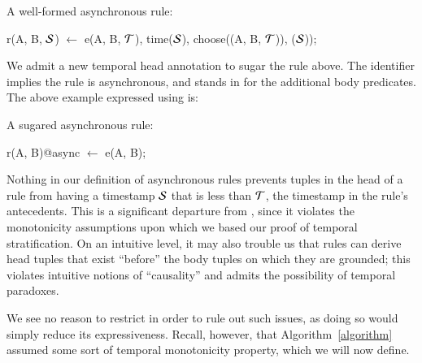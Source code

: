 \begin{example}
A well-formed asynchronous \lang rule:

\begin{Dedalus}
r(A, B, \(\SDedalus\)) \(\leftarrow\) 
  e(A, B, \(\Tau\)),
  time(\(\SDedalus\)), choose((A, B, \(\Tau\))), (\(\SDedalus\)));
\end{Dedalus}
\end{example}

We admit a new temporal head annotation to sugar the rule above.  The
identifier  implies the rule is asynchronous, and stands in for
the additional body predicates.
The above example expressed using  is:

\begin{example}
	A sugared asynchronous \lang rule:
	
\begin{Dedalus}
r(A, B)@async \(\leftarrow\) e(A, B);
\end{Dedalus}
\end{example}


Nothing in our definition of asynchronous rules prevents tuples in the
head of a rule from having a timestamp $\SDedalus$ that is less than
$\Tau$, the timestamp in the rule's antecedents. This is a significant
departure from \slang, since it violates the monotonicity assumptions
upon which we based our proof of temporal stratification.  On an
intuitive level, it may also trouble us that rules can derive head
tuples that exist ``before'' the body tuples on which they are
grounded; this violates intuitive notions of ``causality'' and admits
the possibility of temporal paradoxes.

We see no reason to restrict \lang in order to rule out such issues,
as doing so would simply reduce its expressiveness.  Recall, however,
that Algorithm~\ref{algorithm} assumed some sort of temporal
monotonicity property, which we will now define.

